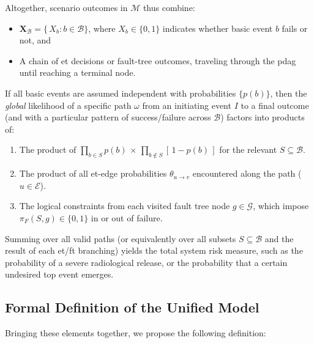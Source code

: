 Altogether, scenario outcomes in \(\mathcal{M}\) thus combine:
\begin{itemize}
\item \(\mathbf{X}_{\mathcal{B}} = \{\,X_b : b\in\mathcal{B}\}\), where \(X_b\in\{0,1\}\) indicates whether basic event \(b\) fails or not, and  
\item A chain of \acrshort{et} decisions or fault-tree outcomes, traveling through the \acrshort{pdag} until reaching a terminal node.  
\end{itemize}
If all basic events are assumed independent with probabilities \(\{p(b)\}\), then the \emph{global} likelihood of a specific path \(\omega\) from an initiating event \(I\) to a final outcome (and with a particular pattern of success/failure across \(\mathcal{B}\)) factors into products of:
\begin{enumerate}
\item The product of \(\prod_{b\in S}p(b)\,\times\,\prod_{b\notin S}[\,1-p(b)\,]\) for the relevant \(S\subseteq\mathcal{B}\).  
\item The product of all \acrshort{et}-edge probabilities \(\theta_{u\to v}\) encountered along the path (\(u\in\mathcal{E}\)).  
\item The logical constraints from each visited fault tree node \(g\in \mathcal{G}\), which impose \(\pi_{F}(S,g)\in\{0,1\}\) in or out of failure.  
\end{enumerate}
Summing over all valid paths (or equivalently over all subsets \(S\subseteq \mathcal{B}\) and the result of each \acrshort{et}/\acrshort{ft} branching) yields the total system risk measure, such as the probability of a severe radiological release, or the probability that a certain undesired top event emerges.

\subsection{Formal Definition of the Unified Model}

Bringing these elements together, we propose the following definition:

